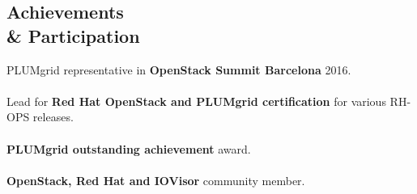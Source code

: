 \documentclass[margin]{res}
\begin{document}
\begin{resume}
\section{Achievements \\ \& Participation} PLUMgrid representative in \textbf{OpenStack Summit Barcelona} 2016. \\ \\
Lead for \textbf{Red Hat OpenStack and PLUMgrid certification} for various RH-OPS releases. \\ \\
\textbf{PLUMgrid outstanding achievement} award. \\ \\
\textbf{OpenStack, Red Hat and IOVisor} community member.
\end{resume}
\end{document}
